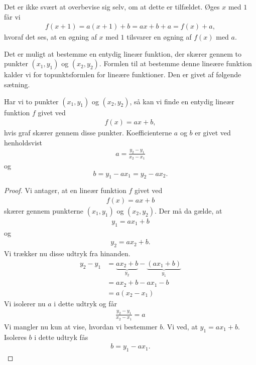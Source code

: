  Det er ikke svært at overbevise sig selv, om at dette er tilfældet. Øges $x$ med $1$ får vi
\begin{align*}
f(x+1) = a(x+1) +b = ax+b + a = f(x)+ a,
\end{align*}
hvoraf det ses, at en øgning af $x$ med $1$ tilsvarer en øgning af $f(x)$ med $a$. 

Det er muligt at bestemme en entydig lineær funktion, der skærer gennem to punkter $(x_1,y_1)$ og $(x_2,y_2)$. Formlen til at bestemme denne lineære funktion kalder vi for topunktsformlen for lineære funktioner. Den er givet af følgende sætning. 
\begin{setn}
Har vi to punkter $(x_1,y_1)$ og $(x_2,y_2)$, så kan vi finde en entydig lineær funktion $f$ givet ved
\begin{align*}
f(x) = ax+b,
\end{align*}
hvis graf skærer gennem disse punkter. Koefficienterne $a$ og $b$ er givet ved henholdsvist
\begin{align*}
a = \frac{y_2-y_1}{x_2-x_1}
\end{align*}
og 
$$b = y_1-ax_1 = y_2-ax_2.$$
\end{setn}
\begin{proof}
Vi antager, at en lineær funktion $f$ givet ved
\begin{align*}
f(x) = ax+b
\end{align*}
skærer gennem punkterne $(x_1,y_1)$ og $(x_2,y_2)$. Der må da gælde, at 
\begin{align*}
y_1 = ax_1 + b
\end{align*}
og 
\begin{align*}
y_2 = ax_2 + b.
\end{align*}
Vi trækker nu disse udtryk fra hinanden.
\begin{align*}
y_2 - y_1 &= \underbrace{ax_2+b}_{y_2}-\underbrace{(ax_1+b)}_{y_1}\\
&= ax_2 + b -ax_1 - b\\
&= a(x_2-x_1)
\end{align*}
Vi isolerer nu $a$ i dette udtryk og får
\begin{align*}
\frac{y_2-y_1}{x_2-x_1} = a
\end{align*}
Vi mangler nu kun at vise, hvordan vi bestemmer $b$. Vi ved, at $y_1 = ax_1 + b$. Isoleres $b$ i dette udtryk fås
\begin{align*}
b = y_1 - ax_1.
\end{align*}

\end{proof}